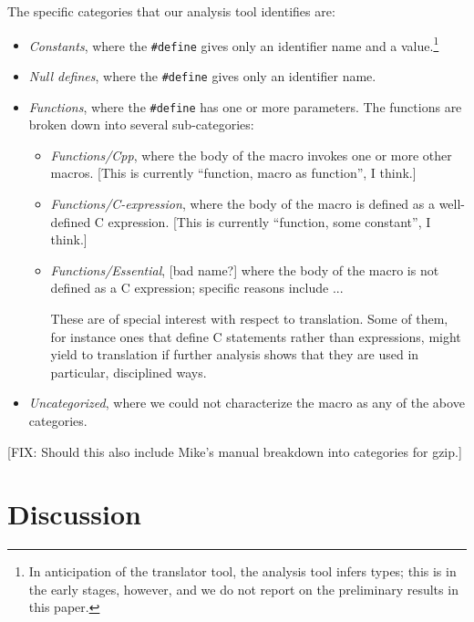 The specific categories that our analysis tool identifies are:
\begin{itemize}

\item {\em Constants\/}, where the \verb+#define+ gives only an
identifier name and a value.\footnote{In anticipation of the
translator tool, the analysis tool infers types; this is in the early
stages, however, and we do not report on the preliminary results in
this paper.}

\item {\em Null defines\/}, where the \verb+#define+ gives only an
identifier name.

\item {\em Functions\/}, where the \verb+#define+ has one or more
parameters.  The functions are broken down into several sub-categories:
\begin{itemize}

\item {\em Functions/Cpp\/}, where the body of the macro invokes one
or more other macros.  [This is currently ``function, macro as
function'', I think.]

\item {\em Functions/C-expression\/}, where the body of the macro is
defined as a well-defined C expression.  [This is currently
``function, some constant'', I think.]

\item {\em Functions/Essential\/}, [bad name?] where the body of the
macro is not defined as a C expression; specific reasons include
...

These are of special interest with respect to translation.  Some of
them, for instance ones that define C statements rather than
expressions, might yield to translation if further analysis shows that
they are used in particular, disciplined ways.

\end{itemize}

\item {\em Uncategorized\/}, where we could not characterize the macro
as any of the above categories.

\end{itemize}

[FIX: Should this also include Mike's manual breakdown into categories
for gzip.]

\section{Discussion}\label{sec:discussion}

